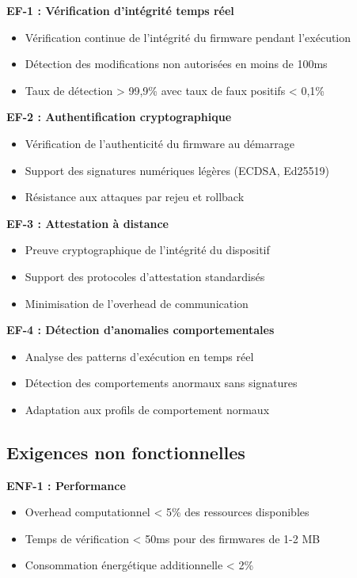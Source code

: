 \textbf{EF-1 : Vérification d'intégrité temps réel}
\begin{itemize}
    \item Vérification continue de l'intégrité du firmware pendant l'exécution
    \item Détection des modifications non autorisées en moins de 100ms
    \item Taux de détection > 99,9\% avec taux de faux positifs < 0,1\%
\end{itemize}

\textbf{EF-2 : Authentification cryptographique}
\begin{itemize}
    \item Vérification de l'authenticité du firmware au démarrage
    \item Support des signatures numériques légères (ECDSA, Ed25519)
    \item Résistance aux attaques par rejeu et rollback
\end{itemize}

\textbf{EF-3 : Attestation à distance}
\begin{itemize}
    \item Preuve cryptographique de l'intégrité du dispositif
    \item Support des protocoles d'attestation standardisés
    \item Minimisation de l'overhead de communication
\end{itemize}

\textbf{EF-4 : Détection d'anomalies comportementales}
\begin{itemize}
    \item Analyse des patterns d'exécution en temps réel
    \item Détection des comportements anormaux sans signatures
    \item Adaptation aux profils de comportement normaux
\end{itemize}

\subsection{Exigences non fonctionnelles}

\textbf{ENF-1 : Performance}
\begin{itemize}
    \item Overhead computationnel < 5\% des ressources disponibles
    \item Temps de vérification < 50ms pour des firmwares de 1-2 MB
    \item Consommation énergétique additionnelle < 2\%
\end{itemize}

